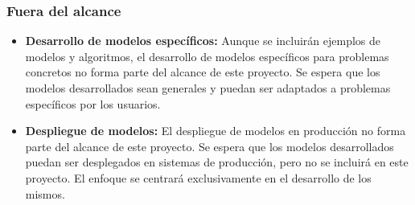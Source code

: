 \subsubsection{Fuera del alcance}
\begin{itemize}
    \item \textbf{Desarrollo de modelos específicos:} Aunque se incluirán ejemplos de
    modelos y algoritmos, el desarrollo de modelos específicos para problemas concretos
    no forma parte del alcance de este proyecto. Se espera que los modelos desarrollados
    sean generales y puedan ser adaptados a problemas específicos por los usuarios.
    \item \textbf{Despliegue de modelos:} El despliegue de modelos en producción no forma
    parte del alcance de este proyecto. Se espera que los modelos desarrollados puedan ser
    desplegados en sistemas de producción, pero no se incluirá en este proyecto. El enfoque
    se centrará exclusivamente en el desarrollo de los mismos.
\end{itemize}

\pagebreak